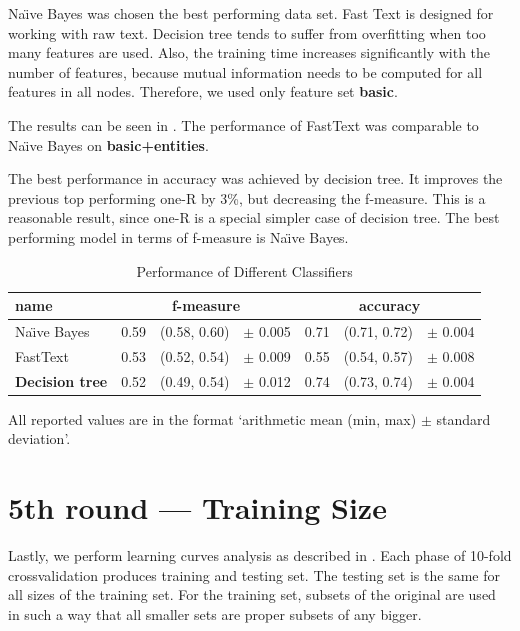 Na\"{\i}ve Bayes was chosen the best performing data set.
Fast Text is designed for working with raw text.
Decision tree tends to suffer from overfitting when too many features are used.
Also, the training time increases significantly with the number of features,
because mutual information needs to be computed for all features in all nodes.
Therefore, we used only feature set \textbf{basic}.

The results can be seen in .
The performance of FastText was comparable to Na\"{\i}ve Bayes on \textbf{basic+entities}.


The best performance in accuracy was achieved by decision tree.
It improves the previous top performing one-R by 3\%, but decreasing the f-measure.
This is a reasonable result, since one-R is a special simpler case of decision tree.
The best performing model in terms of f-measure is Na\"{\i}ve Bayes.


\begin{table}[h!]

\centering
\begin{tabular}{lr@{~}r@{~}rr@{~}r@{~}r}
\toprule
\textbf{name}	& \multicolumn{3}{c}{\textbf{f-measure}} & \multicolumn{3}{c}{\textbf{accuracy}} \\
\midrule

Na\"{\i}ve Bayes & 0.59 & (0.58, 0.60) & $\pm$ 0.005 & 0.71 & (0.71, 0.72) & $\pm$ 0.004		\\

FastText & 0.53 & (0.52, 0.54) & $\pm$ 0.009 & 0.55 & (0.54, 0.57) & $\pm$ 0.008 \\
\textbf{Decision tree} & 0.52 & (0.49, 0.54) & $\pm$ 0.012 & 0.74 & (0.73, 0.74) & $\pm$ 0.004 \\

\bottomrule
\end{tabular}

\caption{Performance of Different Classifiers}\label{tab:clsf_perf}
All reported values are in the format `arithmetic mean (min, max) $\pm$ standard deviation'.
\end{table}


\section{5th round --- Training Size}

Lastly, we perform learning curves analysis as described in .
Each phase of 10-fold crossvalidation produces training and testing set.
The testing set is the same for all sizes of the training set.
For the training set, subsets of the original are used in such a way that 
all smaller sets are proper subsets of any bigger.

